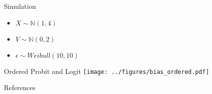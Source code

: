 \documentclass[xcolor=dvipsnames]{beamer}
\begin{document}
\begin{frame}{Simulation}
    \begin{itemize}
        \item $X \sim \mathbb{N}(1, 4)$
        \item $V \sim \mathbb{N}(0, 2)$
        \item $\epsilon \sim Weibull(10, 10)$
    \end{itemize}
\end{frame}

\begin{frame}{Ordered Probit and Logit}
    \texttt{[image: ../figures/bias\_ordered.pdf]}
\end{frame}
   
\begin{frame}{References}\scriptsize


\end{frame}
\end{document}
